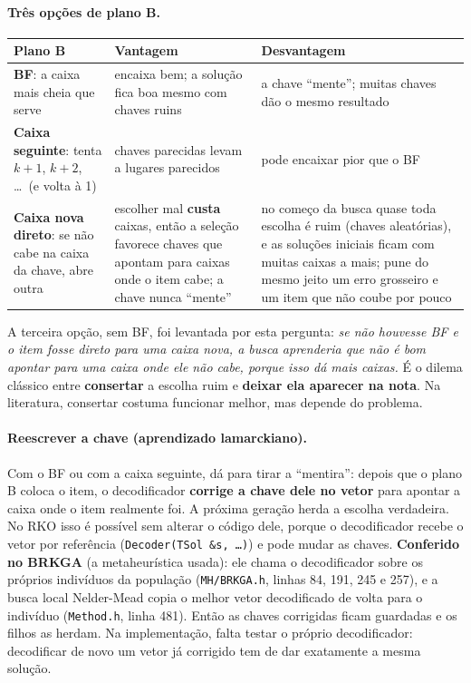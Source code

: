 \documentclass[11pt,a4paper]{article}
\begin{document}
\paragraph{Três opções de plano B.}
\begin{center}\small
\begin{tabular}{@{}>{\raggedright\arraybackslash}p{3.6cm}>{\raggedright\arraybackslash}p{5.9cm}>{\raggedright\arraybackslash}p{6.1cm}@{}}
\toprule
Plano B & Vantagem & Desvantagem \\ \midrule
\textbf{BF}: a caixa mais cheia que serve & encaixa bem; a solução fica boa mesmo com chaves ruins & a chave ``mente'';
  muitas chaves dão o mesmo resultado \\ \addlinespace
\textbf{Caixa seguinte}: tenta $k+1$, $k+2$, \dots\ (e volta à 1) & chaves parecidas levam a lugares parecidos & pode
  encaixar pior que o BF \\ \addlinespace
\textbf{Caixa nova direto}: se não cabe na caixa da chave, abre outra & escolher mal \textbf{custa} caixas, então a
  seleção favorece chaves que apontam para caixas onde o item cabe; a chave nunca ``mente'' & no começo da busca quase
  toda escolha é ruim (chaves aleatórias), e as soluções iniciais ficam com muitas caixas a mais; pune do mesmo jeito
  um erro grosseiro e um item que não coube por pouco \\
\bottomrule
\end{tabular}
\end{center}

\noindent A terceira opção, sem BF, foi levantada por esta pergunta: \emph{se não houvesse BF e o item fosse direto para
uma caixa nova, a busca aprenderia que não é bom apontar para uma caixa onde ele não cabe, porque isso dá mais caixas.}
É o dilema clássico entre \textbf{consertar} a escolha ruim e \textbf{deixar ela aparecer na nota}. Na literatura,
consertar costuma funcionar melhor, mas depende do problema.

\paragraph{Reescrever a chave (aprendizado lamarckiano).} Com o BF ou com a caixa seguinte, dá para tirar a ``mentira'':
depois que o plano B coloca o item, o decodificador \textbf{corrige a chave dele no vetor} para apontar a caixa onde o item
realmente foi. A próxima geração herda a escolha verdadeira. No RKO isso é possível sem alterar o código dele, porque o
decodificador recebe o vetor por referência (\texttt{Decoder(TSol \&s, \dots)}) e pode mudar as chaves.
\textbf{Conferido no BRKGA} (a metaheurística usada): ele chama o decodificador sobre os próprios indivíduos da população
(\texttt{MH/BRKGA.h}, linhas 84, 191, 245 e 257), e a busca local Nelder-Mead copia o melhor vetor decodificado de volta
para o indivíduo (\texttt{Method.h}, linha 481). Então as chaves corrigidas ficam guardadas e os filhos as herdam. Na
implementação, falta testar o próprio decodificador: decodificar de novo um vetor já corrigido tem de dar exatamente a
mesma solução.
\end{document}
